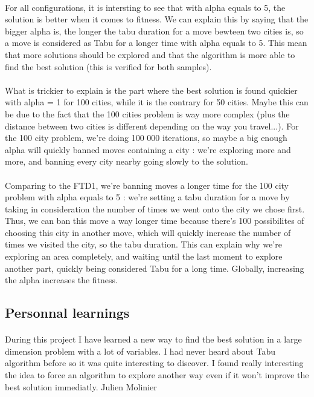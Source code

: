 \documentclass[12pt,oneside,a4paper]{article}
\begin{document}
\newpage
\paragraph{}
For all configurations, it is intersting to see that with alpha equals to 5, the solution is better when it comes to fitness. We can explain this by saying that the bigger alpha is, the longer
   the tabu duration for a move bewteen two cities is,
   so a move is considered as Tabu for a longer time with alpha equals to 5. This mean that more solutions should be explored
   and that the algorithm is more able to find the best solution (this is verified for both samples).
\paragraph{}
   What is trickier to explain is the part where the best solution is found quickier with alpha = 1 for 100 cities, while it is
   the contrary for 50 cities. Maybe this can be due to the fact that the 100 cities problem is way more complex (plus the distance
   between two cities is different depending on the way you travel...). For the 100 city problem, we’re doing 100 000 iterations,
    so maybe a big enough alpha will quickly banned moves containing a city : we’re exploring more and more, and banning every city nearby
    going slowly to the solution.
    \paragraph{}
    Comparing to the FTD1, we’re banning moves a longer time for the 100 city problem with alpha equals
    to 5 : we’re setting a tabu duration for a move by taking in consideration the number of times
    we went onto the city we chose first. Thus, we can ban this move a way longer time because there’s 100
    possibilites of choosing this city in another move,
    which will quickly increase the number of times we visited the city, so the tabu duration.
    This can explain why we’re exploring an area completely, and waiting until the last moment to
    explore another part, quickly being considered Tabu for a long time.
    Globally, increasing the alpha increases the fitness.

\subsection{Personnal learnings}

\paragraph{}
During this project I have learned a new way to find the best solution in a large dimension problem with a lot of variables. 
I had never heard about Tabu algorithm before so it was quite interesting to discover.
I found really interesting the idea to force an algorithm to explore another way even if it 
won't improve the best solution immediatly. Julien Molinier
\end{document}
